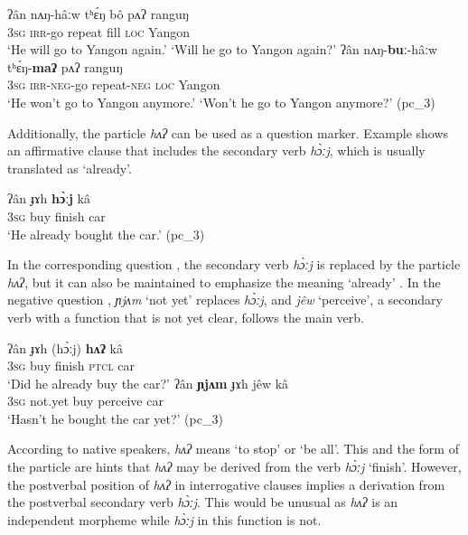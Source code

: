 \documentclass[output=paper,colorlinks,citecolor=brown]{langscibook}
\begin{document}
\ea\label{ex:rum:29}
    \ea\label{ex:rum:29a}
        \gll ʔân	nʌŋ-hâːw	tʰɛ́ŋ	bô	pʌʔ	ranguŋ \\ 
             3\textsc{sg} \textsc{irr}{}-go repeat fill \textsc{loc} Yangon \\
        \glt ‘He will go to Yangon again.’
        \glt ‘Will he go to Yangon again?’
    \ex\label{ex:rum:29b}
        \gll ʔân	nʌŋ-\textbf{buː}-hâːw	tʰɛ́ŋ-\textbf{maʔ}	pʌʔ	ranguŋ \\
             3\textsc{sg} \textsc{irr-neg}{}-go repeat{}-\textsc{neg} \textsc{loc} Yangon \\
        \glt ‘He won’t go to Yangon anymore.’
        \glt ‘Won’t he go to Yangon anymore?’ (pc\_3)
    \z
\z 


Additionally, the particle \textit{hʌʔ} can be used as a question marker. Example  shows an affirmative clause that includes the secondary verb \textit{hɔ̀ːj}, which is usually translated as ‘already’.

\ea\label{ex:rum:30}
    \gll ʔân	ɟɤh	\textbf{hɔ̀ːj}	kâ \\
         3\textsc{sg} buy finish car \\
    \glt ‘He already bought the car.’ (pc\_3)
\z 

In the corresponding question , the secondary verb \textit{hɔ̀ːj} is replaced by the particle \textit{hʌʔ}, but it can also be maintained to emphasize the meaning ‘already’ . In the negative question , \textit{ɲjʌm} ‘not yet’ replaces \textit{hɔ̀ːj}, and \textit{jêw} ‘perceive’, a secondary verb with a function that is not yet clear, follows the main verb.

\ea\label{ex:rum:31}
    \ea\label{ex:rum:31a}
        \gll ʔân	ɟɤh	(hɔ̀ːj)	\textbf{hʌʔ}	kâ \\ 
             3\textsc{sg} buy finish \textsc{ptcl} car \\
        \glt ‘Did he already buy the car?’
    \ex\label{ex:rum:31b}
        \gll ʔân	\textbf{ɲjʌm}	ɟɤh	jêw	kâ \\
             3\textsc{sg} not.yet buy perceive car \\
        \glt ‘Hasn’t he bought the car yet?’ (pc\_3)
    \z
\z 

According to native speakers, \textit{hʌʔ} means ‘to stop’ or ‘be all’. This and the form of the particle are hints that \textit{hʌʔ} may be derived from the verb \textit{hɔ̀ːj} ‘finish’. However, the postverbal position of \textit{hʌʔ} in interrogative clauses implies a derivation from the postverbal secondary verb \textit{hɔ̀ːj}. This would be unusual as \textit{hʌʔ} is an independent morpheme while \textit{hɔ̀ːj} in this function is not.
\end{document}
